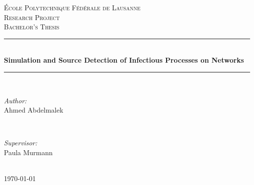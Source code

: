 \begin{titlepage}

\newcommand{\HRule}{\rule{\linewidth}{0.5mm}} %

\center %

\textsc{\LARGE École Polytechnique Fédérale de Lausanne}\\[2cm] %
\textsc{\Large Research Project}\\[1cm] %
\textsc{\large Bachelor's Thesis}\\[1.2cm] %

\HRule \\[0.8cm]
{ \huge \bfseries Simulation and Source Detection of Infectious Processes on Networks}\\[0.4cm] %
\HRule \\[2cm]
 
\begin{minipage}{0.4\textwidth}
\begin{flushleft} \large
\emph{Author:}\\
Ahmed Abdelmalek\\
\end{flushleft}
\end{minipage}
~
\begin{minipage}{0.4\textwidth}
\begin{flushright} \large
\emph{Supervisor:} \\
Paula Murmann
\end{flushright}
\end{minipage}\\[2cm]

{\large \today}\\[2cm]


\end{titlepage}
